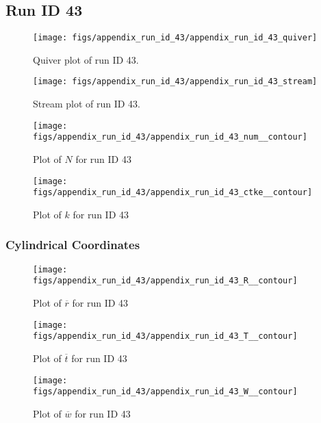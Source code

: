 \subsection{Run ID 43}
\begin{figure}[H]
\centering
\texttt{[image: figs/appendix\_run\_id\_43/appendix\_run\_id\_43\_quiver]}
\caption{Quiver plot of run ID 43.}
\label{fig:appendix_run_id_43_quiver}
\end{figure}


\begin{figure}[H]
\centering
\texttt{[image: figs/appendix\_run\_id\_43/appendix\_run\_id\_43\_stream]}
\caption{Stream plot of run ID 43.}
\label{fig:appendix_run_id_43_stream}
\end{figure}


\begin{figure}[H]
\centering
\texttt{[image: figs/appendix\_run\_id\_43/appendix\_run\_id\_43\_num\_\_contour]}
\caption{Plot of $N$ for run ID 43}
\label{fig:appendix_run_id_43_num__contour}
\end{figure}


\begin{figure}[H]
\centering
\texttt{[image: figs/appendix\_run\_id\_43/appendix\_run\_id\_43\_ctke\_\_contour]}
\caption{Plot of $k$ for run ID 43}
\label{fig:appendix_run_id_43_ctke__contour}
\end{figure}


\subsubsection{Cylindrical Coordinates}
\begin{figure}[H]
\centering
\texttt{[image: figs/appendix\_run\_id\_43/appendix\_run\_id\_43\_R\_\_contour]}
\caption{Plot of $\overline{r}$ for run ID 43}
\label{fig:appendix_run_id_43_R__contour}
\end{figure}


\begin{figure}[H]
\centering
\texttt{[image: figs/appendix\_run\_id\_43/appendix\_run\_id\_43\_T\_\_contour]}
\caption{Plot of $\overline{t}$ for run ID 43}
\label{fig:appendix_run_id_43_T__contour}
\end{figure}


\begin{figure}[H]
\centering
\texttt{[image: figs/appendix\_run\_id\_43/appendix\_run\_id\_43\_W\_\_contour]}
\caption{Plot of $\overline{w}$ for run ID 43}
\label{fig:appendix_run_id_43_W__contour}
\end{figure}


